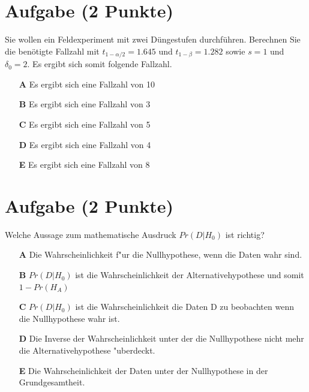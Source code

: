 \documentclass[a4paper, 10pt]{scrartcl}\usepackage[]{graphicx}\usepackage[]{xcolor}
\begin{document}
\section{Aufgabe \hfill (2 Punkte)}




Sie wollen ein Feldexperiment mit zwei D{\"u}ngestufen durchf{\"u}hren. Berechnen
Sie die ben{\"o}tigte Fallzahl mit $t_{1-\alpha/2} = 1.645$ und
$t_{1-\beta} = 1.282$ sowie $s = 1$ und
$\delta_0 = 2$. Es ergibt sich somit folgende Fallzahl.



\begin{enumerate}
\item [\textbf{A} \msquare] Es ergibt sich eine Fallzahl von 10
\item [\textbf{B} \msquare] Es ergibt sich eine Fallzahl von 3
\item [\textbf{C} \msquare] Es ergibt sich eine Fallzahl von 5
\item [\textbf{D} \msquare] Es ergibt sich eine Fallzahl von 4
\item [\textbf{E} \msquare] Es ergibt sich eine Fallzahl von 8
\end{enumerate}

\section{Aufgabe \hfill (2 Punkte)}

Welche Aussage zum mathematische Ausdruck $Pr(D|H_0)$ ist richtig? 



\begin{enumerate}
\item [\textbf{A} \msquare] Die Wahrscheinlichkeit f{"u}r die Nullhypothese, wenn die Daten wahr sind.
\item [\textbf{B} \msquare] $Pr(D|H_0)$ ist die Wahrscheinlichkeit der Alternativehypothese und somit $1 - Pr(H_A)$
\item [\textbf{C} \msquare] $Pr(D|H_0)$ ist die Wahrscheinlichkeit die Daten D zu beobachten wenn die Nullhypothese wahr ist.
\item [\textbf{D} \msquare] Die Inverse der Wahrscheinlichkeit unter der die Nullhypothese nicht mehr die Alternativehypothese {"u}berdeckt.
\item [\textbf{E} \msquare] Die Wahrscheinlichkeit der Daten unter der Nullhypothese in der Grundgesamtheit.
\end{enumerate}
\end{document}
